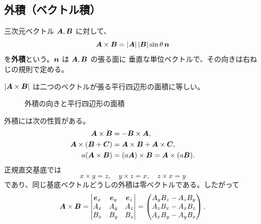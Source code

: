 \subsection{外積（ベクトル積）}

\begin{definition}
三次元ベクトル $\bm{A},\bm{B}$ に対して、
\begin{equation}
  \bm{A}\times\bm{B}
  =|\bm{A}|\,|\bm{B}|\sin\theta\,\bm{n}
\end{equation}
を\textbf{外積}という。$\bm{n}$ は $\bm{A},\bm{B}$ の張る面に
垂直な単位ベクトルで、その向きは右ねじの規則で定める。
\end{definition}

$|\bm{A}\times\bm{B}|$ は二つのベクトルが張る平行四辺形の面積に等しい。

\begin{figure}[htbp]
  \centering
  \caption{外積の向きと平行四辺形の面積}
\end{figure}

外積には次の性質がある。
\begin{align}
  \bm{A}\times\bm{B}&=-\bm{B}\times\bm{A},\\
  \bm{A}\times(\bm{B}+\bm{C})
  &=\bm{A}\times\bm{B}+\bm{A}\times\bm{C},\\
  a(\bm{A}\times\bm{B})&=(a\bm{A})\times\bm{B}
  =\bm{A}\times(a\bm{B}).
\end{align}
正規直交基底では
\begin{equation}
 \unit{x}\times\unit{y}=\unit{z},\quad
 \unit{y}\times\unit{z}=\unit{x},\quad
 \unit{z}\times\unit{x}=\unit{y}
\end{equation}
であり、同じ基底ベクトルどうしの外積は零ベクトルである。したがって
\begin{equation}
 \bm{A}\times\bm{B}=
 \begin{vmatrix}
   \bm{e}_{x}&\bm{e}_{y}&\bm{e}_{z}\\
   A_x&A_y&A_z\\
   B_x&B_y&B_z
 \end{vmatrix}
 =\begin{pmatrix}
 A_yB_z-A_zB_y\\A_zB_x-A_xB_z\\A_xB_y-A_yB_x
 \end{pmatrix}.
\end{equation}

